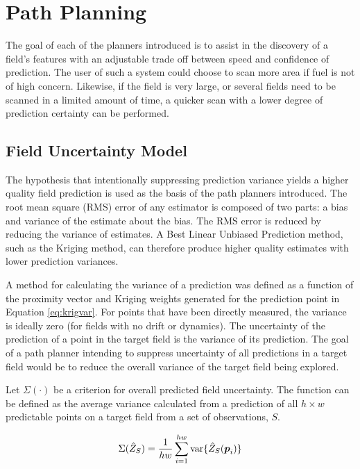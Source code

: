 \chapter{Path Planning} \label{ch:pp}
The goal of each of the planners introduced is to assist in the discovery of a field's features with an adjustable trade off between speed and confidence of prediction. The user of such a system could choose to scan more area if fuel is not of high concern. Likewise, if the field is very large, or several fields need to be scanned in a limited amount of time, a quicker scan with a lower degree of prediction certainty can be performed.

\section{Field Uncertainty Model} \label{sec:fielduncert}
The hypothesis that intentionally suppressing prediction variance yields a higher quality field prediction is used as the basis of the path planners introduced. The root mean square (RMS) error of any estimator is composed of two parts: a bias and variance of the estimate about the bias. The RMS error is reduced by reducing the variance of estimates. A Best Linear Unbiased Prediction method, such as the Kriging method, can therefore produce higher quality estimates with lower prediction variances.

A method for calculating the variance of a prediction was defined as a function of the proximity vector and Kriging weights generated for the prediction point in Equation \ref{eq:krigvar}. For points that have been directly measured, the variance is ideally zero (for fields with no drift or dynamics). The uncertainty of the prediction of a point in the target field is the variance of its prediction. The goal of a path planner intending to suppress uncertainty of all predictions in a target field would be to reduce the overall variance of the target field being explored.

Let $\Sigma(\cdot)$ be a criterion for overall predicted field uncertainty. The function can be defined as the average variance calculated from a prediction of all $h\times w$ predictable points on a target field from a set of observations, $S$.

\begin{equation}
	\Sigma(\hat{Z}_{S}) = \frac{1}{hw}\sum_{i = 1}^{hw} \text{var}\{\hat{Z}_{S}({\it{\boldsymbol{p}}}_i)\}
	\label{eq:fielduncert}
\end{equation}

